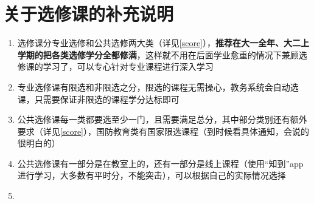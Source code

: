\section[关于选修课的补充说明]{关于选修课的补充说明}
\begin{enumerate}
      \item 选修课分专业选修和公共选修两大类（详见\uline{\ref{score}}），\textbf{推荐在大一全年、大二上学期的把各类选修学分全都修满}，这样就不用在后面学业愈重的情况下兼顾选修课的学习了，可以专心针对专业课程进行深入学习
      \item 专业选修课有限选和非限选之分，限选的课程无需操心，教务系统会自动选课，只需要保证非限选的课程学分达标即可
      \item 公共选修课每一类都要选至少一门，且需要满足总分，其中部分类别还有额外要求（详见\uline{\ref{score}}），国防教育类有国家限选课程（到时候看具体通知，会说的很明白的）
      \item 公共选修课有一部分是在教室上的，还有一部分是线上课程（使用“知到”app进行学习，大多数有平时分，不能突击），可以根据自己的实际情况选择\footnotemark
      \item \textbf{}
\end{enumerate}

